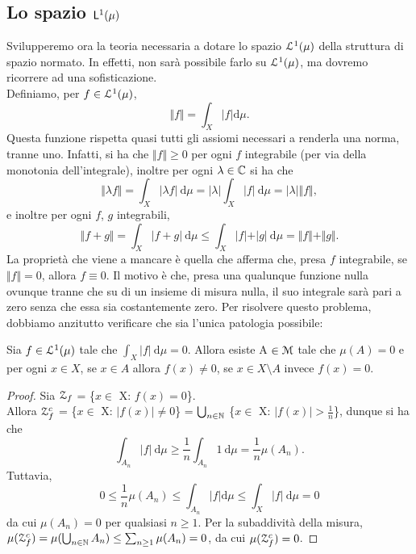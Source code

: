 \documentclass[Completo.tex]{subfiles}
\begin{document}
	\subsection{Lo spazio $\sf[L]^1(\mu)$}
	Svilupperemo ora la teoria necessaria a dotare lo spazio $\eu[L]^1(\mu)$ della struttura di spazio normato. In effetti, non sarà possibile farlo su $\eu[L]^1(\mu)$, ma dovremo ricorrere ad una sofisticazione. \\
	Definiamo, per $f \in \eu[L]^1(\mu)$,
	\begin{equation*}
	\Vert f \Vert = \int_X \vert f \vert \mathrm{d}\mu.
	\end{equation*}
	Questa funzione rispetta quasi tutti gli assiomi necessari a renderla una norma, tranne uno. Infatti, si ha che $\Vert f \Vert \geq 0$ per ogni $f$ integrabile (per via della monotonia dell'integrale), inoltre per ogni $\lambda \in \bb[C]$ si ha che
	\begin{equation*}
	\Vert \lambda f \Vert = \int_X \vert \lambda f \vert \ \mathrm{d}\mu = \vert \lambda \vert \int_X \vert f \vert \ \mathrm{d}\mu = \vert \lambda \vert \Vert f \Vert,
	\end{equation*}
	e inoltre per ogni $f$, $g$ integrabili,
	\begin{equation*}
	\Vert f+g \Vert = \int_X \vert f+g \vert \ \mathrm{d}\mu \leq \int_X \vert f \vert + \vert g \vert \ \mathrm{d}\mu = \Vert f \Vert + \Vert g \Vert.
	\end{equation*}
	La proprietà che viene a mancare è quella che afferma che, presa $f$ integrabile, se $\Vert f \Vert = 0$, allora $f \equiv 0$. Il motivo è che, presa una qualunque funzione nulla ovunque tranne che su di un insieme di misura nulla, il suo integrale sarà pari a zero senza che essa sia costantemente zero. Per risolvere questo problema, dobbiamo anzitutto verificare che sia l'unica patologia possibile:
	\begin{Prop}
		Sia $f \in \eu[L]^1(\mu)$ tale che $\int_X \vert f \vert \ \mathrm{d}\mu = 0$. Allora esiste A $\in \eu[M]$ tale che $\mu(A) = 0$ e per ogni $x \in X$, se $x \in A$ allora $f(x) \neq 0$, se $x \in X \setminus A$ invece $f(x) = 0$.
	\end{Prop}
	\begin{proof}
		Sia $\eu[Z]_f$ = \{$x \in$ X: $f(x) = 0$\}. \\
		Allora $\eu[Z]_f^{c}$ = \{$x \in$ X: $\vert f(x) \vert \neq 0$\} = $\bigcup_{n \in \bb[N]}$ \{$x \in$ X: $\vert f(x) \vert > \frac{1}{n}$\}, dunque si ha che
		\begin{equation*}
		\int_{A_n} \vert f \vert \ \mathrm{d}\mu \geq \frac{1}{n} \int_{A_n} 1 \ \mathrm{d}\mu = \frac{1}{n} \mu(A_n).
		\end{equation*}
		Tuttavia,
		\begin{equation*}
		0 \leq \frac{1}{n} \mu(A_n) \leq \int_{A_n} \vert f \vert \mathrm{d}\mu \leq \int_X \vert f \vert \ \mathrm{d}\mu = 0
		\end{equation*}
		da cui $\mu(A_n) = 0$ per qualsiasi $n \geq 1$. Per la subaddività della misura, $\mu(\eu[Z]_f^{c}) = \mu(\bigcup_{n \in \bb[N]}A_n) \leq \sum_{n\geq 1} \mu(A_n) = 0$, da cui $\mu(\eu[Z]_f^{c}) = 0$.
	\end{proof}
\end{document}
